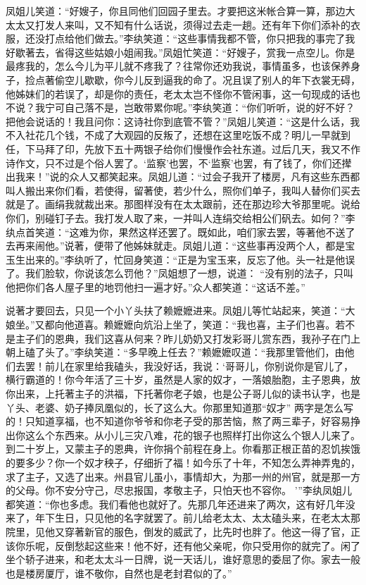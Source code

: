 \begin{parag}


    凤姐儿笑道：“好嫂子，你且同他们回园子里去。才要把这米帐合算一算，那边大太太又打发人来叫，又不知有什么话说，须得过去走一趟。还有年下你们添补的衣服，还没打点给他们做去。”李纨笑道：“这些事情我都不管，你只把我的事完了我好歇著去，省得这些姑娘小姐闹我。”凤姐忙笑道：“好嫂子，赏我一点空儿。你是最疼我的，怎么今儿为平儿就不疼我了？往常你还劝我说，事情虽多，也该保养身子，捡点著偷空儿歇歇，你今儿反到逼我的命了。况且误了别人的年下衣裳无碍，他姊妹们的若误了，却是你的责任，老太太岂不怪你不管闲事，这一句现成的话也不说？我宁可自己落不是，岂敢带累你呢。”李纨笑道：“你们听听，说的好不好？把他会说话的！我且问你：这诗社你到底管不管？”凤姐儿笑道：“这是什么话，我不入社花几个钱，不成了大观园的反叛了，还想在这里吃饭不成？明儿一早就到任，下马拜了印，先放下五十两银子给你们慢慢作会社东道。过后几天，我又不作诗作文，只不过是个俗人罢了。‘监察’也罢，不‘监察’也罢，有了钱了，你们还撵出我来！”说的众人又都笑起来。凤姐儿道：“过会子我开了楼房，凡有这些东西都叫人搬出来你们看，若使得，留著使，若少什么，照你们单子，我叫人替你们买去就是了。画绢我就裁出来。那图样没有在太太跟前，还在那边珍大爷那里呢。说给你们，别碰钉子去。我打发人取了来，一并叫人连绢交给相公们矾去。如何？”李纨点首笑道：“这难为你，果然这样还罢了。既如此，咱们家去罢，等著他不送了去再来闹他。”说著，便带了他姊妹就走。凤姐儿道：“这些事再没两个人，都是宝玉生出来的。”李纨听了，忙回身笑道：“正是为宝玉来，反忘了他。头一社是他误了。我们脸软，你说该怎么罚他？”凤姐想了一想，说道： “没有别的法子，只叫他把你们各人屋子里的地罚他扫一遍才好。”众人都笑道：“这话不差。”
\end{parag}


\begin{parag}


    说著才要回去，只见一个小丫头扶了赖嬷嬷进来。凤姐儿等忙站起来，笑道：“大娘坐。”又都向他道喜。赖嬷嬷向炕沿上坐了，笑道：“我也喜，主子们也喜。若不是主子们的恩典，我们这喜从何来？昨儿奶奶又打发彩哥儿赏东西，我孙子在门上朝上磕了头了。”李纨笑道：“多早晚上任去？”赖嬷嬷叹道：“我那里管他们，由他们去罢！前儿在家里给我磕头，我没好话，我说：‘哥哥儿，你别说你是官儿了，横行霸道的！你今年活了三十岁，虽然是人家的奴才，一落娘胎胞，主子恩典，放你出来，上托著主子的洪福，下托著你老子娘，也是公子哥儿似的读书认字，也是丫头、老婆、奶子捧凤凰似的，长了这么大。你那里知道那“奴才” 两字是怎么写的！只知道享福，也不知道你爷爷和你老子受的那苦恼，熬了两三辈子，好容易挣出你这么个东西来。从小儿三灾八难，花的银子也照样打出你这么个银人儿来了。到二十岁上，又蒙主子的恩典，许你捐个前程在身上。你看那正根正苗的忍饥挨饿的要多少？你一个奴才秧子，仔细折了福！如今乐了十年，不知怎么弄神弄鬼的，求了主子，又选了出来。州县官儿虽小，事情却大，为那一州的州官，就是那一方的父母。你不安分守己，尽忠报国，孝敬主子，只怕天也不容你。 ’”李纨凤姐儿都笑道：“你也多虑。我们看他也就好了。先那几年还进来了两次，这有好几年没来了，年下生日，只见他的名字就罢了。前儿给老太太、太太磕头来，在老太太那院里，见他又穿著新官的服色，倒发的威武了，比先时也胖了。他这一得了官，正该你乐呢，反倒愁起这些来！他不好，还有他父亲呢，你只受用你的就完了。闲了坐个轿子进来，和老太太斗一日牌，说一天话儿，谁好意思的委屈了你。家去一般也是楼房厦厅，谁不敬你，自然也是老封君似的了。”
\end{parag}


